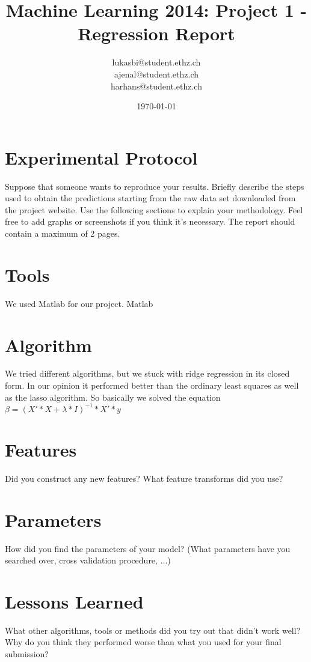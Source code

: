 \documentclass[a4paper, 11pt]{article}
\title{Machine Learning 2014: Project 1 - Regression Report}
\author{lukasbi@student.ethz.ch\\ ajenal@student.ethz.ch\\ harhans@student.ethz.ch\\}
\date{\today}
\begin{document}
\maketitle

\section*{Experimental Protocol}
Suppose that someone wants to reproduce your results. Briefly describe the steps used to obtain the
predictions starting from the raw data set downloaded from the project website. Use the following
sections to explain your methodology. Feel free to add graphs or screenshots if you think it's
necessary. The report should contain a maximum of 2 pages.

\section{Tools}
We used Matlab for our project. 
Matlab


\section{Algorithm}
We tried different algorithms, but we stuck with ridge regression in its closed form. In our opinion it performed better than the ordinary least squares as well as the lasso algorithm.
So basically we solved the equation 
\begin{math}
\beta = (X'*X+\lambda*I)^{-1}*X'*y
\end{math}

\section{Features}
Did you construct any new features? What feature transforms did you use?

\section{Parameters}
How did you find the parameters of your model? (What parameters have you searched over, cross validation procedure, $\ldots$)

\section{Lessons Learned} What other algorithms, tools or methods did you try out that didn't work well?
Why do you think they performed worse than what you used for your final submission?
\end{document}
